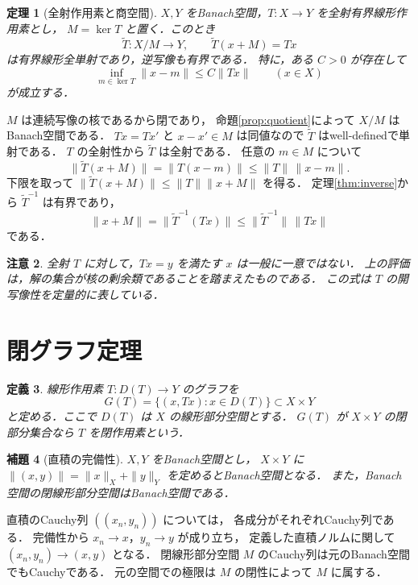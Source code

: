 \documentclass[a5paper,10pt,onecolumn]{jsarticle}
\makeatletter
\theoremstyle{mathnotetheorem}
\newtheorem{theorem}{定理}[section]
\newtheorem{definition}[theorem]{定義}
\newtheorem{lemma}[theorem]{補題}
\newtheorem{remark}[theorem]{注意}
\renewcommand{\proofname}{証明}
\renewenvironment{proof}[1][\proofname]{%
  \par\pushQED{\qed}\normalfont\topsep4\p@\@plus2\p@\relax
  \trivlist\item[\hskip\labelsep\bfseries #1]\ignorespaces
}{\popQED\endtrivlist\@endpefalse}
\makeatother
\begin{document}
\begin{theorem}[全射作用素と商空間]\label{thm:quotient-isom}
$X,Y$ をBanach空間，$T:X\to Y$ を全射有界線形作用素とし，
$M=\ker T$ と置く．このとき
\[
 \widetilde T:X/M\longrightarrow Y,\qquad
 \widetilde T(x+M)=Tx
\]
は有界線形全単射であり，逆写像も有界である．
特に，ある $C>0$ が存在して
\[
 \inf_{m\in\ker T}\|x-m\|
 \le C\|Tx\|\qquad(x\in X)
\]
が成立する．
\end{theorem}
\begin{proof}
$M$ は連続写像の核であるから閉であり，
命題\ref{prop:quotient}によって $X/M$ はBanach空間である．
$Tx=Tx'$ と $x-x'\in M$ は同値なので
$\widetilde T$ はwell-definedで単射である．
$T$ の全射性から $\widetilde T$ は全射である．
任意の $m\in M$ について
\[
 \|\widetilde T(x+M)\|
 =\|T(x-m)\|\le\|T\|\,\|x-m\|.
\]
下限を取って
$\|\widetilde T(x+M)\|\le\|T\|\|x+M\|$ を得る．
定理\ref{thm:inverse}から
$\widetilde T^{-1}$ は有界であり，
\[
 \|x+M\|
 =\|\widetilde T^{-1}(Tx)\|
 \le\|\widetilde T^{-1}\|\,\|Tx\|
\]
である．
\end{proof}

\begin{remark}
全射 $T$ に対して，$Tx=y$ を満たす $x$ は一般に一意ではない．
上の評価は，解の集合が核の剰余類であることを踏まえたものである．
この式は $T$ の開写像性を定量的に表している．
\end{remark}

\section{閉グラフ定理}

\begin{definition}
線形作用素 $T:D(T)\to Y$ の\emph{グラフ}を
\[
 G(T)=\{(x,Tx):x\in D(T)\}\subset X\times Y
\]
と定める．ここで $D(T)$ は $X$ の線形部分空間とする．
$G(T)$ が $X\times Y$ の閉部分集合なら
$T$ を\emph{閉作用素}という．
\end{definition}

\begin{lemma}[直積の完備性]\label{lem:product}
$X,Y$ をBanach空間とし，
$X\times Y$ に $\|(x,y)\|=\|x\|_X+\|y\|_Y$
を定めるとBanach空間となる．
また，Banach空間の閉線形部分空間はBanach空間である．
\end{lemma}
\begin{proof}
直積のCauchy列 $((x_n,y_n))$ については，
各成分がそれぞれCauchy列である．
完備性から $x_n\to x$，$y_n\to y$ が成り立ち，
定義した直積ノルムに関して
$(x_n,y_n)\to(x,y)$ となる．
閉線形部分空間 $M$ のCauchy列は元のBanach空間でもCauchyである．
元の空間での極限は $M$ の閉性によって $M$ に属する．
\end{proof}
\end{document}
